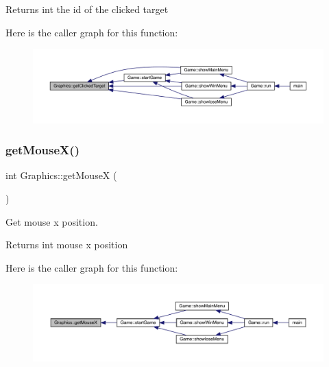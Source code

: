 \begin{DoxyReturn}{Returns}
int the id of the clicked target 
\end{DoxyReturn}
Here is the caller graph for this function\+:
\nopagebreak
\begin{figure}[H]
\begin{center}
\leavevmode
\includegraphics[width=350pt]{class_graphics_a53c02790c4103525e542982175f1addb_icgraph}
\end{center}
\end{figure}
\mbox{\label{class_graphics_a48c86f4a3a87446fd8df707899e92d4f}} 
\subsubsection{\texorpdfstring{get\+Mouse\+X()}{getMouseX()}}
{\footnotesize\ttfamily int Graphics\+::get\+MouseX (\begin{DoxyParamCaption}{ }\end{DoxyParamCaption})}



Get mouse x position. 

\begin{DoxyReturn}{Returns}
int mouse x position 
\end{DoxyReturn}
Here is the caller graph for this function\+:
\nopagebreak
\begin{figure}[H]
\begin{center}
\leavevmode
\includegraphics[width=350pt]{class_graphics_a48c86f4a3a87446fd8df707899e92d4f_icgraph}
\end{center}
\end{figure}
\mbox{\label{class_graphics_a4e21e1cfcd4523e86ddbc9c5d246de1e}} 

